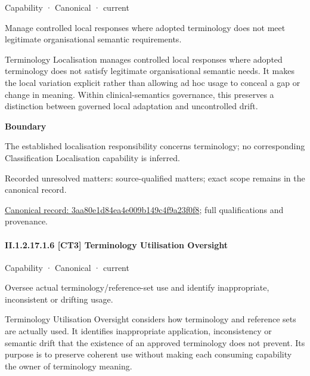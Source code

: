 \label{element:3aa80e1d84ea4e009b149c4f9a23f0f8}
{\small Capability · Canonical · current}\par

Manage controlled local responses where adopted terminology does not meet legitimate organisational semantic requirements.



Terminology Localisation manages controlled local responses where adopted terminology does not satisfy legitimate organisational semantic needs. It makes the local variation explicit rather than allowing ad hoc usage to conceal a gap or change in meaning. Within clinical-semantics governance, this preserves a distinction between governed local adaptation and uncontrolled drift.



\textbf{Boundary}



The established localisation responsibility concerns terminology; no corresponding Classification Localisation capability is inferred.


{\small Recorded unresolved matters: source-qualified matters; exact scope remains in the canonical record.}\par
{\footnotesize \href{../../../../../../../continuum/strategy/capability/3aa80e1d84ea4e009b149c4f9a23f0f8.md}{Canonical record: 3aa80e1d84ea4e009b149c4f9a23f0f8}; full qualifications and provenance.}\par
\paragraph*{II.1.2.17.1.6 [CT3] Terminology Utilisation Oversight}
\label{navigation:II.1.2.17.1.6}

\label{element:4ca436cd90b745daa290b067c57a0450}
{\small Capability · Canonical · current}\par

Oversee actual terminology/reference-set use and identify inappropriate, inconsistent or drifting usage.



Terminology Utilisation Oversight considers how terminology and reference sets are actually used. It identifies inappropriate application, inconsistency or semantic drift that the existence of an approved terminology does not prevent. Its purpose is to preserve coherent use without making each consuming capability the owner of terminology meaning.



